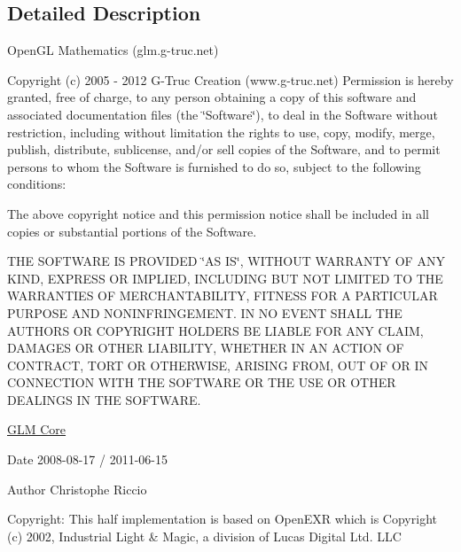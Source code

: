 \subsection{\-Detailed \-Description}
\-Open\-G\-L \-Mathematics (glm.\-g-\/truc.\-net)

\-Copyright (c) 2005 -\/ 2012 \-G-\/\-Truc \-Creation (www.\-g-\/truc.\-net) \-Permission is hereby granted, free of charge, to any person obtaining a copy of this software and associated documentation files (the \char`\"{}\-Software\char`\"{}), to deal in the \-Software without restriction, including without limitation the rights to use, copy, modify, merge, publish, distribute, sublicense, and/or sell copies of the \-Software, and to permit persons to whom the \-Software is furnished to do so, subject to the following conditions\-:

\-The above copyright notice and this permission notice shall be included in all copies or substantial portions of the \-Software.

\-T\-H\-E \-S\-O\-F\-T\-W\-A\-R\-E \-I\-S \-P\-R\-O\-V\-I\-D\-E\-D \char`\"{}\-A\-S I\-S\char`\"{}, \-W\-I\-T\-H\-O\-U\-T \-W\-A\-R\-R\-A\-N\-T\-Y \-O\-F \-A\-N\-Y \-K\-I\-N\-D, \-E\-X\-P\-R\-E\-S\-S \-O\-R \-I\-M\-P\-L\-I\-E\-D, \-I\-N\-C\-L\-U\-D\-I\-N\-G \-B\-U\-T \-N\-O\-T \-L\-I\-M\-I\-T\-E\-D \-T\-O \-T\-H\-E \-W\-A\-R\-R\-A\-N\-T\-I\-E\-S \-O\-F \-M\-E\-R\-C\-H\-A\-N\-T\-A\-B\-I\-L\-I\-T\-Y, \-F\-I\-T\-N\-E\-S\-S \-F\-O\-R \-A \-P\-A\-R\-T\-I\-C\-U\-L\-A\-R \-P\-U\-R\-P\-O\-S\-E \-A\-N\-D \-N\-O\-N\-I\-N\-F\-R\-I\-N\-G\-E\-M\-E\-N\-T. \-I\-N \-N\-O \-E\-V\-E\-N\-T \-S\-H\-A\-L\-L \-T\-H\-E \-A\-U\-T\-H\-O\-R\-S \-O\-R \-C\-O\-P\-Y\-R\-I\-G\-H\-T \-H\-O\-L\-D\-E\-R\-S \-B\-E \-L\-I\-A\-B\-L\-E \-F\-O\-R \-A\-N\-Y \-C\-L\-A\-I\-M, \-D\-A\-M\-A\-G\-E\-S \-O\-R \-O\-T\-H\-E\-R \-L\-I\-A\-B\-I\-L\-I\-T\-Y, \-W\-H\-E\-T\-H\-E\-R \-I\-N \-A\-N \-A\-C\-T\-I\-O\-N \-O\-F \-C\-O\-N\-T\-R\-A\-C\-T, \-T\-O\-R\-T \-O\-R \-O\-T\-H\-E\-R\-W\-I\-S\-E, \-A\-R\-I\-S\-I\-N\-G \-F\-R\-O\-M, \-O\-U\-T \-O\-F \-O\-R \-I\-N \-C\-O\-N\-N\-E\-C\-T\-I\-O\-N \-W\-I\-T\-H \-T\-H\-E \-S\-O\-F\-T\-W\-A\-R\-E \-O\-R \-T\-H\-E \-U\-S\-E \-O\-R \-O\-T\-H\-E\-R \-D\-E\-A\-L\-I\-N\-G\-S \-I\-N \-T\-H\-E \-S\-O\-F\-T\-W\-A\-R\-E.

\hyperlink{group__core}{\-G\-L\-M \-Core}

\begin{DoxyDate}{\-Date}
2008-\/08-\/17 / 2011-\/06-\/15 
\end{DoxyDate}
\begin{DoxyAuthor}{\-Author}
\-Christophe \-Riccio
\end{DoxyAuthor}
\-Copyright\-: \-This half implementation is based on \-Open\-E\-X\-R which is \-Copyright (c) 2002, \-Industrial \-Light \& \-Magic, a division of \-Lucas \-Digital \-Ltd. \-L\-L\-C 